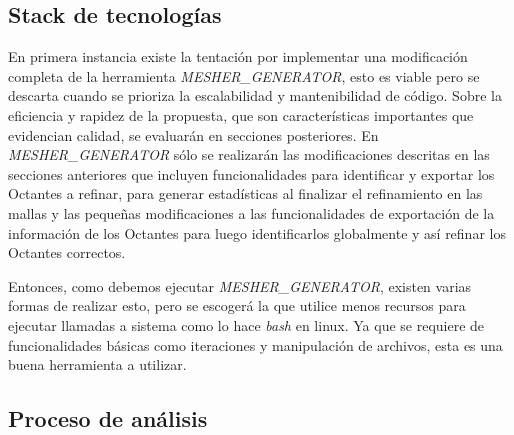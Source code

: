 \subsection{Stack de tecnologías}

En primera instancia existe la tentación por implementar una modificación completa de la herramienta \textit{MESHER\_GENERATOR}, esto es viable pero se descarta cuando se prioriza la escalabilidad y mantenibilidad de código. Sobre la eficiencia y rapidez de la propuesta, que son características importantes que evidencian calidad, se evaluarán en secciones posteriores.
En \textit{MESHER\_GENERATOR} sólo se realizarán las modificaciones descritas en las secciones anteriores que incluyen funcionalidades para identificar y exportar los Octantes a refinar, para generar estadísticas al finalizar el refinamiento en las mallas y las pequeñas modificaciones a las funcionalidades de exportación de la información de los Octantes para luego identificarlos globalmente y así refinar los Octantes correctos.

Entonces, como debemos ejecutar \textit{MESHER\_GENERATOR}, existen varias formas de realizar esto, pero se escogerá la que utilice menos recursos para ejecutar llamadas a sistema como lo hace \textit{bash} en linux. Ya que se requiere de funcionalidades básicas como iteraciones y manipulación de archivos, esta es una buena herramienta a utilizar.

\subsection{Proceso de análisis}

